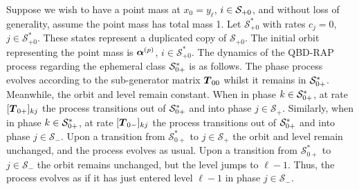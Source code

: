\begin{rem}
Suppose we wish to have a point mass at \(x_0=y_{\ell}\), \(i\in\mathcal{S}_{+0}\), and without loss of generality, assume the point mass has total mass 1. Let \(\mathcal S_{+0}^*\) with rates \(c_j=0\), \(j\in\mathcal S_{+0}^*\). These states represent a duplicated copy of \(\mathcal S_{+0}\). The initial orbit representing the point mass is \(\boldsymbol \alpha^{(p)}\), \(i\in\mathcal S_{+0}^*\). The dynamics of the QBD-RAP process regarding the ephemeral class \(\mathcal{S}_{0+}^*\) is as follows. The phase process evolves according to the sub-generator matrix \(\boldsymbol T_{00}\) whilst it remains in \(\mathcal{S}_{0+}^*\). Meanwhile, the orbit and level remain constant. When in phase \(k\in\mathcal{S}_{0+}^*\), at rate \([\boldsymbol T_{0+}]_{kj}\) the process transitions out of \(\mathcal{S}_{0+}^*\) and into phase \(j\in\mathcal S_+\). Similarly, when in phase \(k\in\mathcal{S}_{0+}^*\), at rate \([\boldsymbol T_{0-}]_{kj}\) the process transitions out of \(\mathcal{S}_{0+}^*\) and into phase \(j\in\mathcal S_-\). Upon a transition from \(\mathcal S_{0+}^*\) to \(j\in\mathcal S_{+}\) the orbit and level remain unchanged, and the process evolves as usual. Upon a transition from \(\mathcal S_{0+}^*\) to \(j\in\mathcal S_{-}\) the orbit remains unchanged, but the level jumps to \(\ell - 1\). Thus, the process evolves as if it has just entered level \(\ell-1\) in phase \(j\in\mathcal S_-\). 
\end{rem}

